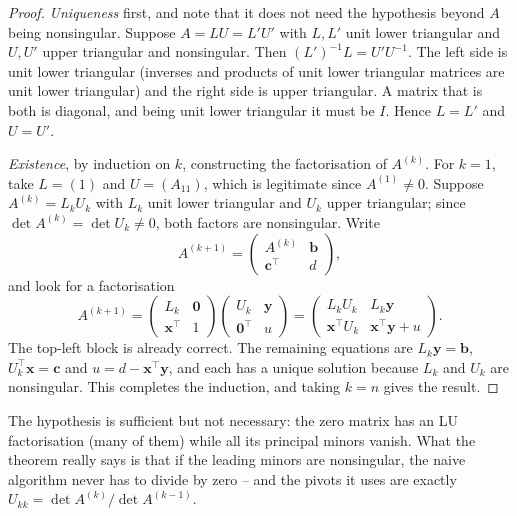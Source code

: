 \documentclass[a4paper]{scrartcl}
\begin{document}
\begin{proof}
  \emph{Uniqueness} first, and note that it does not need the hypothesis beyond $A$ being nonsingular. Suppose $A = LU = L'U'$ with $L, L'$ unit lower triangular and $U, U'$ upper triangular and nonsingular. Then $(L')^{-1}L = U'U^{-1}$. The left side is unit lower triangular (inverses and products of unit lower triangular matrices are unit lower triangular) and the right side is upper triangular. A matrix that is both is diagonal, and being unit lower triangular it must be $I$. Hence $L = L'$ and $U = U'$.

  \emph{Existence}, by induction on $k$, constructing the factorisation of $A^{(k)}$. For $k = 1$, take $L = (1)$ and $U = (A_{11})$, which is legitimate since $A^{(1)} \neq 0$. Suppose $A^{(k)} = L_kU_k$ with $L_k$ unit lower triangular and $U_k$ upper triangular; since $\det A^{(k)} = \det U_k \neq 0$, both factors are nonsingular. Write
  $$
  A^{(k+1)} = \begin{pmatrix} A^{(k)} & \mathbf{b}\\ \mathbf{c}^\top & d\end{pmatrix},
  $$
  and look for a factorisation
  $$
  A^{(k+1)} = \begin{pmatrix}L_k & \mathbf{0}\\ \mathbf{x}^\top & 1\end{pmatrix}\begin{pmatrix}U_k & \mathbf{y}\\ \mathbf{0}^\top & u\end{pmatrix} = \begin{pmatrix}L_kU_k & L_k\mathbf{y}\\ \mathbf{x}^\top U_k & \mathbf{x}^\top\mathbf{y} + u\end{pmatrix}.
  $$
  The top-left block is already correct. The remaining equations are $L_k\mathbf{y} = \mathbf{b}$, $U_k^\top \mathbf{x} = \mathbf{c}$ and $u = d - \mathbf{x}^\top\mathbf{y}$, and each has a unique solution because $L_k$ and $U_k$ are nonsingular. This completes the induction, and taking $k = n$ gives the result.
\end{proof}

\begin{remark}
  The hypothesis is sufficient but not necessary: the zero matrix has an LU factorisation (many of them) while all its principal minors vanish. What the theorem really says is that if the leading minors are nonsingular, the naive algorithm never has to divide by zero -- and the pivots it uses are exactly $U_{kk} = \det A^{(k)}/\det A^{(k-1)}$.
\end{remark}
\end{document}
